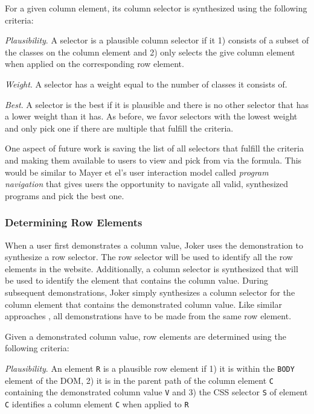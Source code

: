 \documentclass[sigconf,10pt]{acmart}
\begin{document}
For a given column element, its column selector is synthesized using the
following criteria:

\emph{Plausibility}. A selector is a plausible column selector if it 1)
consists of a subset of the classes on the column element and 2) only
selects the give column element when applied on the corresponding row
element.

\emph{Weight}. A selector has a weight equal to the number of classes it
consists of.

\emph{Best}. A selector is the best if it is plausible and there is no
other selector that has a lower weight than it has. As before, we favor
selectors with the lowest weight and only pick one if there are multiple
that fulfill the criteria.

One aspect of future work is saving the list of all selectors that
fulfill the criteria and making them available to users to view and pick
from via the formula. This would be similar to Mayer et el's user
interaction model called \emph{program navigation} \citep{mayer2015}
that gives users the opportunity to navigate all valid, synthesized
programs and pick the best one.

\hypertarget{determining-row-elements}{%
\subsubsection{Determining Row
Elements}\label{determining-row-elements}}

When a user first demonstrates a column value, Joker uses the
demonstration to synthesize a row selector. The row selector will be
used to identify all the row elements in the website. Additionally, a
column selector is synthesized that will be used to identify the element
that contains the column value. During subsequent demonstrations, Joker
simply synthesizes a column selector for the column element that
contains the demonstrated column value. Like similar approaches
\citep{huynh2006, lin2009, chasins2018}, all demonstrations have to be
made from the same row element.

Given a demonstrated column value, row elements are determined using the
following criteria:

\emph{Plausibility}. An element \texttt{R} is a plausible row element if
1) it is within the \texttt{BODY} element of the DOM, 2) it is in the
parent path of the column element \texttt{C} containing the demonstrated
column value \texttt{V} and 3) the CSS selector \texttt{S} of element
\texttt{C} identifies a column element \texttt{C\textquotesingle{}} when
applied to \texttt{R}
\end{document}
